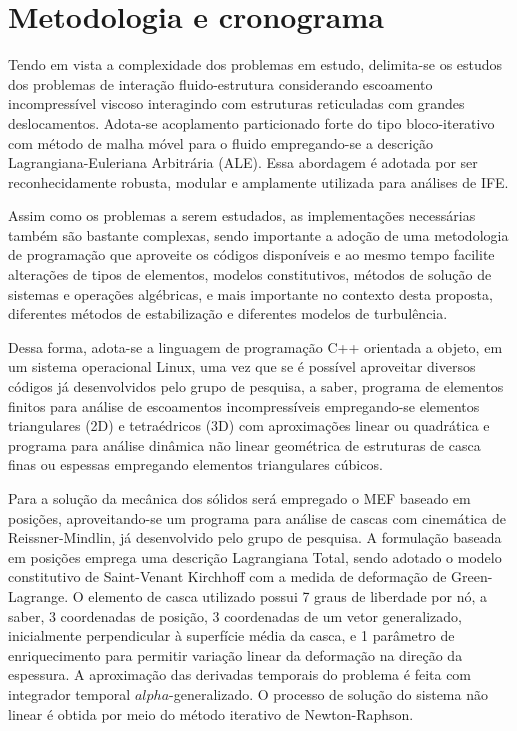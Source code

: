 \chapter{Metodologia e cronograma} \label{MetodologiaCronograma}

Tendo em vista a complexidade dos problemas em estudo, delimita-se os estudos dos problemas de interação fluido-estrutura considerando escoamento incompressível viscoso interagindo com estruturas reticuladas com grandes deslocamentos. Adota-se acoplamento particionado forte do tipo bloco-iterativo com método de malha móvel para o fluido empregando-se a descrição Lagrangiana-Euleriana Arbitrária (ALE). Essa abordagem é adotada por ser reconhecidamente robusta, modular e amplamente utilizada para análises de IFE.

Assim como os problemas a serem estudados, as implementações necessárias também são bastante complexas, sendo importante a adoção de uma metodologia de programação que aproveite os códigos disponíveis e ao mesmo tempo facilite alterações de tipos de elementos, modelos constitutivos, métodos de solução de sistemas e operações algébricas, e mais importante no contexto desta proposta, diferentes métodos de estabilização e diferentes modelos de turbulência.

Dessa forma, adota-se a linguagem de programação C++ orientada a objeto, em um sistema operacional Linux, uma vez que se é possível aproveitar diversos códigos já desenvolvidos pelo grupo de pesquisa, a saber, programa de elementos finitos para análise de escoamentos incompressíveis empregando-se elementos triangulares (2D) e tetraédricos (3D) com aproximações linear ou quadrática e programa para análise dinâmica não linear geométrica de estruturas de casca finas ou espessas empregando elementos triangulares cúbicos.

Para a solução da mecânica dos sólidos será empregado o MEF baseado em posições, aproveitando-se um programa para análise de cascas com cinemática de Reissner-Mindlin, já desenvolvido pelo grupo de pesquisa. A formulação baseada em posições emprega uma descrição Lagrangiana Total, sendo adotado o modelo constitutivo de Saint-Venant Kirchhoff  com a medida de deformação de Green-Lagrange. O elemento de casca utilizado possui 7 graus de liberdade por nó, a saber, 3 coordenadas de posição, 3 coordenadas de um vetor generalizado, inicialmente perpendicular à superfície média da casca, e 1 parâmetro de enriquecimento para permitir variação linear da deformação na direção da espessura. A aproximação das derivadas temporais do problema é feita com integrador temporal $alpha$-generalizado. O processo de solução do sistema não linear é obtida por meio do método iterativo de Newton-Raphson.

